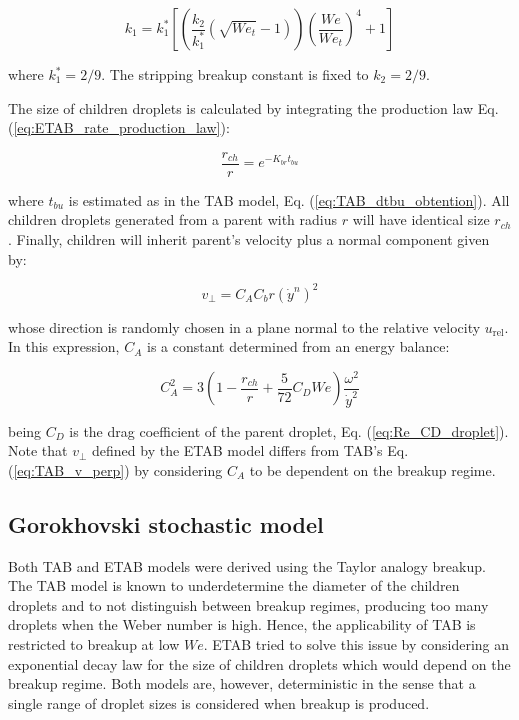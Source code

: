 \begin{equation}
k_1 = k_1^* \left[\left(  \frac{k_2}{k_1^*} \left( \sqrt{We_t} - 1 \right) \right) \left( \frac{We}{We_t} \right)^4 + 1 \right]
\end{equation}

where $k_1^* = 2/9$. The stripping breakup constant is fixed to $k_2 = 2/9$.

The size of children droplets is calculated by integrating the production law Eq. (\ref{eq:ETAB_rate_production_law}):

\begin{equation}
\label{eq:ETAB_model_radius_ratio}
\frac{r_{ch}}{r} = e ^{-K_{br} t_{bu}}
\end{equation}

where $t_{bu}$ is estimated as in the TAB model, Eq. (\ref{eq:TAB_dtbu_obtention}). All children droplets generated from a parent with radius $r$ will have identical size $r_{ch}$. Finally, children will inherit parent's velocity plus a normal component given by:

\begin{equation}
v_\perp = C_A C_b r \left(\dot{y}^n\right)^2 
\end{equation}

whose direction is randomly chosen in a plane normal to the relative velocity $u_\mathrm{rel}$. In this expression, $C_A$ is a constant determined from an energy balance:

\begin{equation}
C_A^2 = 3 \left( 1 - \frac{r_{ch}}{r} + \frac{5}{72} C_D We \right) \frac{\omega^2}{\dot{y}^2}
\end{equation}

being $C_D$ is the drag coefficient of the parent droplet, Eq. (\ref{eq:Re_CD_droplet}). Note that $v_\perp$ defined by the ETAB model differs from TAB's Eq. (\ref{eq:TAB_v_perp}) by considering $C_A$ to be dependent on the breakup regime.


\subsection{Gorokhovski stochastic model}
\label{subsec:ch4_goro_model}

Both TAB and ETAB models were derived using the Taylor analogy breakup. The TAB model is known to underdetermine the diameter of the children droplets and to not distinguish between breakup regimes, producing too many droplets when the Weber number is high. Hence, the applicability of TAB is restricted to breakup at low $We$. ETAB tried to solve this issue by considering an exponential decay law for the size of children droplets which would depend on the breakup regime. Both models are, however, deterministic in the sense that a single range of droplet sizes is considered when breakup is produced.

